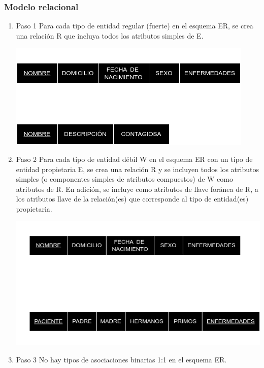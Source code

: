 \documentclass[a4paper,12pt]{article}
\begin{document}
\subsubsection*{Modelo relacional}
\begin{enumerate}
  \item[] Paso 1
  \thispagestyle{fancy} %
  Para cada tipo de entidad regular (fuerte) en el esquema ER, se crea una relación R que incluya todos los atributos simples de E.
  \begin{center}
    \includegraphics[scale = .5]{IMA/E2P1.png}
  \end{center}

  \item[] Paso 2
  \thispagestyle{fancy} %
  Para cada tipo de entidad débil W en el esquema ER con un tipo de entidad propietaria E, 
  se crea una relación R y se incluyen todos los atributos simples 
  (o componentes simples de atributos compuestos) de W como atributos de R. En adición, 
  se incluye como atributos de llave foránea de R, a los atributos llave de la relación(es) 
  que corresponde al tipo de entidad(es) propietaria.
  \begin{center}
    \includegraphics[scale = .5]{IMA/E2P2.png}
  \end{center}

  \item[] Paso 3
  \thispagestyle{fancy} %
  No hay tipos de asociaciones binarias 1:1 en el esquema ER.


\end{enumerate}
\end{document}
